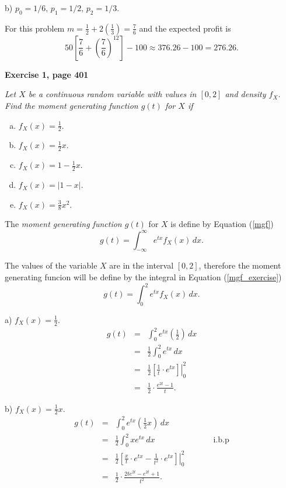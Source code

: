 \documentclass[12pt]{article}
\begin{document}
	\noindent b) $p_0 = 1/6, \, p_1 = 1/2, \, p_2 = 1/3$.
	
	For this problem $m = \frac{1}{2}+ 2\left(\frac{1}{3}\right) = \frac{7}{6}$ and the expected profit is $$50 \left[ \frac{7}{6}+\left(\frac{7}{6} \right)^{12} \right]-100 \approx 376.26 - 100 = 276.26.$$
	
	

	{\bf Exercise 1, page 401}
	
	{\em Let $X$ be a continuous random variable with values in $[0,2]$ and density $f_X$. Find the moment generating function $g(t)$ for $X$ if
		\begin{enumerate}[a)]
			\item $f_X(x) = \frac{1}{2}$.
			\item $f_X (x) = \frac{1}{2}x$.
			\item $f_X (x) = 1 - \frac{1}{2}x$.
			\item $f_X (x) = |1 - x|$.
			\item $f_X (x) = \frac{3}{8}x^2$.
		\end{enumerate}
	}
	
	The {\em moment generating function $g(t)$} for $X$ is define by Equation (\ref{mgf})
	\begin{equation}
	g(t) = \int_{-\infty}^{\infty} e^{tx} f_X(x) \, dx.
	\label{mgf}
	\end{equation}
	
	The values of the variable $X$ are in the interval $[0,2]$, therefore the moment generating funcion will be define by the integral in Equation (\ref{mgf_exercise}) 
	\begin{equation}
		g(t) = \int_{0}^{2} e^{tx} f_X(x) \, dx.
	\label{mgf_exercise}
	\end{equation}
	
	\noindent a) $f_X(x) = \frac{1}{2}$.
	\begin{eqnarray*}
		g(t) &=& \int_{0}^{2} e^{tx} \left(\frac{1}{2}\right)\, dx \\
		&=& \frac{1}{2} \int_{0}^{2} e^{tx} \, dx \\
		&=& \frac{1}{2} \left. \left[ \frac{1}{t} \cdot e^{tx} \right] \right|_{0}^{2} \\
		&=& \frac{1}{2}	\cdot \frac{e^{2t}-1}{t}.
	\end{eqnarray*}

    \noindent b) $f_X(x) = \frac{1}{2}x$.
	\begin{eqnarray*}
		g(t) &=& \int_{0}^{2} e^{tx} \left(\frac{1}{2} x \right)\, dx \\
		&=& \frac{1}{2} \int_{0}^{2} xe^{tx} \, dx \hspace{3cm} \text{i.b.p} \\
		&=& \frac{1}{2} \left. \left[ \frac{x}{t} \cdot e^{tx} - \frac{1}{t^2} \cdot e^{tx}\right] \right|_{0}^{2} \\
		&=& \frac{1}{2} \cdot \frac{2te^{2t} - e^{2t} + 1}{t^2}.
	\end{eqnarray*}
\end{document}
